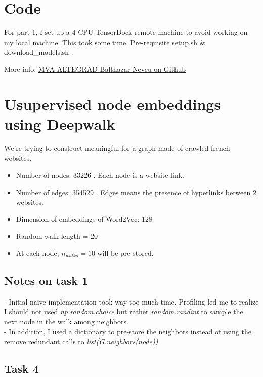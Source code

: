\documentclass[a4paper]{article}
\begin{document}

\section*{Code}
For part 1, I set up a 4 CPU TensorDock remote machine to avoid working on my local machine.
This took some time. Pre-requisite setup.sh \& download\_models.sh .

More info:
\href{https://github.com/balthazarneveu/MVA23_ALTEGRAD/#readme}{MVA ALTEGRAD Balthazar Neveu on Github}

\section{Usupervised node embeddings using Deepwalk}
We're trying to construct meaningful for a graph made of crawled french websites.

\begin{itemize}
    \item Number of nodes: 33226 . Each node is a website link.
    \item Number of edges: 354529 . Edges means the presence of hyperlinks between 2 websites.
    \item Dimension of embeddings of Word2Vec: 128
    \item Random walk length = 20
    \item At each node, $n_{walks}=10$ will be pre-stored.
\end{itemize}
\subsection*{Notes on task 1}
- Initial naïve implementation took way too much time. Profiling led me to realize I should not used
\textit{np.random.choice} but rather \textit{random.randint} to sample the next node in the walk
among neighbors. \\
- In addition, I used a dictionary to pre-store the neighbors instead of using the remove redundant calls to \textit{list(G.neighbors(node))}
\subsection*{Task 4}
\end{document}
